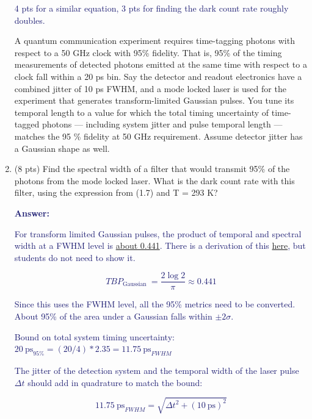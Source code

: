 \documentclass[11pt]{caltech_thesis} %
\begin{document}
\begin{enumerate}
  \textcolor{midnightblue}{4 pts for a similar equation, 3 pts for finding the dark count rate roughly doubles. }

  A quantum communication experiment requires time-tagging photons with respect to a 50 GHz clock with 95\% fidelity. That is, 95\% of the timing measurements of detected photons emitted at the same time with respect to a clock fall within a 20 ps bin. Say the detector and readout electronics have a combined jitter of 10 ps FWHM, and a mode locked laser is used for the experiment that generates transform-limited Gaussian pulses. You tune its temporal length to a value for which the total timing uncertainty of time-tagged photons --- including system jitter and pulse temporal length --- matches the 95 \% fidelity at 50 GHz requirement. Assume detector jitter has a Gaussian shape as well.
\item
  (8 pts) Find the spectral width of a filter that would transmit 95\% of the photons from the mode locked laser. What is the dark count rate with this filter, using the expression from (1.7) and T = 293 K?

  \textcolor{midnightblue}{ \textbf{Answer:} }

  \textcolor{midnightblue}{For transform limited Gaussian pulses, the product of temporal and spectral width at a FWHM level is \href{https://www.lasercalculator.com/transform-limited-pulse-calculator/}{about 0.441}. There is a derivation of this \href{https://www.physicsforums.com/threads/time-bandwidth-product-ideal-mode-locking.171404/post-1339948}{here}, but students do not need to show it. }

  \textcolor{midnightblue}{

  $$T B P_{\text {Gaussian }}=\frac{2 \log 2}{\pi} \approx 0.441$$

  }

  \textcolor{midnightblue}{ Since this uses the FWHM level, all the 95\% metrics need to be converted. About 95\% of the area under a Gaussian falls within $\pm 2 \sigma$. }

  \textcolor{midnightblue}{ Bound on total system timing uncertainty: $20~\text{ps}_{95\%} = (20/4)*2.35 = 11.75~\text{ps}_{FWHM}$ }

  \textcolor{midnightblue}{ The jitter of the detection system and the temporal width of the laser pulse $\Delta t$ should add in quadrature to match the bound: }

  \textcolor{midnightblue}{

  $$ 11.75~\text{ps}_{FWHM} = \sqrt{ \Delta t^2 + (10~\text{ps})^2}$$

}
\end{enumerate}
\end{document}
